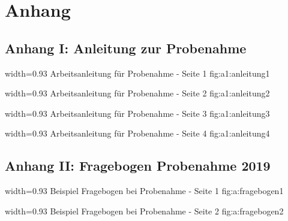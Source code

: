 \section{Anhang}
\subsection{Anhang I: Anleitung zur Probenahme}
\label{chap:anhang_Anleitung}

  {width=0.93\textwidth} %
  {Arbeitsanleitung für Probenahme - Seite 1} %
  {} %
  {fig:a1:anleitung1} %
  
  {width=0.93\textwidth} %
  {Arbeitsanleitung für Probenahme - Seite 2} %
  {} %
  {fig:a1:anleitung2} %
  
  {width=0.93\textwidth} %
  {Arbeitsanleitung für Probenahme - Seite 3} %
  {} %
  {fig:a1:anleitung3} %
  
  {width=0.93\textwidth} %
  {Arbeitsanleitung für Probenahme - Seite 4} %
  {} %
  {fig:a1:anleitung4} %

\subsection{Anhang II: Fragebogen Probenahme 2019}
\label{chap:anhang_Fragebogen}
  {width=0.93\textwidth} %
  {Beispiel Fragebogen bei Probenahme - Seite 1} %
  {} %
  {fig:a:fragebogen1} %
  
  {width=0.93\textwidth} %
  {Beispiel Fragebogen bei Probenahme - Seite 2} %
  {} %
  {fig:a:fragebogen2} %

